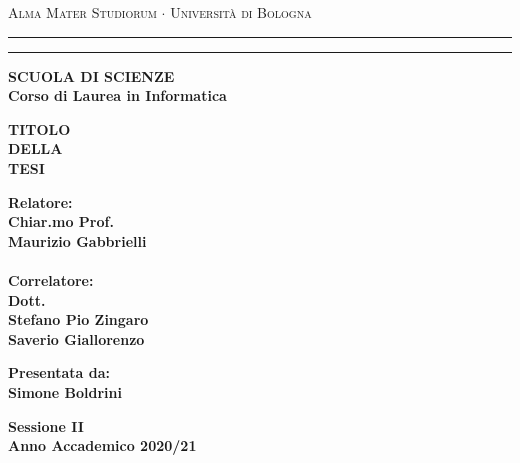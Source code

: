 \documentclass[../tesi.tex]{subfiles}
\begin{document}
\begin{titlepage}
\begin{center}
{{\Large{\textsc{Alma Mater Studiorum $\cdot$ Universit\`a di
Bologna}}}} \rule[0.1cm]{15.8cm}{0.1mm}
\rule[0.5cm]{15.8cm}{0.6mm}
{\small{\bf SCUOLA DI SCIENZE\\
Corso di Laurea in Informatica }}
\end{center}
\vspace{15mm}
\begin{center}
{\LARGE{\bf TITOLO}}\\
\vspace{3mm}
{\LARGE{\bf DELLA}}\\
\vspace{3mm}
{\LARGE{\bf TESI}}\\
\end{center}
\vspace{40mm}
\par
\noindent
\begin{minipage}[t]{0.47\textwidth}
{\large{\bf Relatore:\\
Chiar.mo Prof.\\
Maurizio Gabbrielli}}\\
\\{\large{\bf Correlatore:\\
Dott.\\Stefano Pio Zingaro\\Saverio Giallorenzo}}
\end{minipage}
\hfill
\begin{minipage}[t]{0.47\textwidth}\raggedleft
{\large{\bf Presentata da:\\ Simone Boldrini}}
\end{minipage}
\vspace{20mm}
\begin{center}
{\large{\bf Sessione II\\
Anno Accademico 2020/21}}
\end{center}
\end{titlepage}
\end{document}
